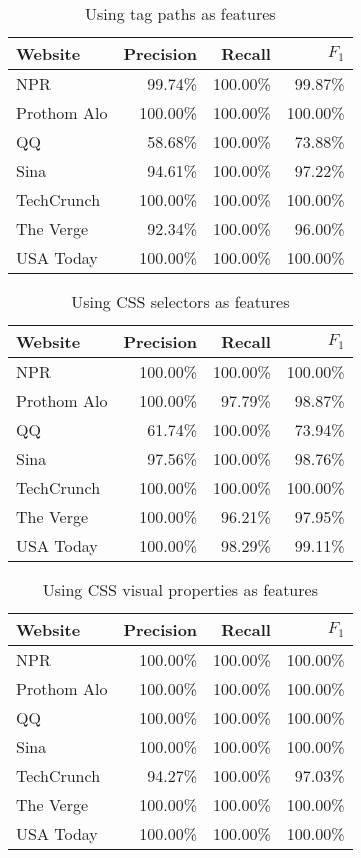 \documentclass{acm_proc_article-sp}
\begin{document}
\begin{table}
\centering
\caption{\label{table:tagpath}Using tag paths as features}
\begin{tabular}{|l|r|r|r|} \hline
Website&Precision&Recall&$F_1$\\ \hline\hline
NPR&99.74\%&100.00\%&99.87\%\\ \hline
Prothom Alo&100.00\%&100.00\%&100.00\%\\ \hline
QQ&58.68\%&100.00\%&73.88\%\\ \hline
Sina&94.61\%&100.00\%&97.22\%\\ \hline
TechCrunch&100.00\%&100.00\%&100.00\%\\ \hline
The Verge&92.34\%&100.00\%&96.00\%\\ \hline
USA Today&100.00\%&100.00\%&100.00\%\\ \hline
\end{tabular}
\end{table}

\begin{table}[t]
\centering
\caption{\label{table:selectors}Using CSS selectors as features}
\begin{tabular}{|l|r|r|r|} \hline
Website&Precision&Recall&$F_1$\\ \hline\hline
NPR&100.00\%&100.00\%&100.00\%\\ \hline
Prothom Alo&100.00\%&97.79\%&98.87\%\\ \hline
QQ&61.74\%&100.00\%&73.94\%\\ \hline
Sina&97.56\%&100.00\%&98.76\%\\ \hline
TechCrunch&100.00\%&100.00\%&100.00\%\\ \hline
The Verge&100.00\%&96.21\%&97.95\%\\ \hline
USA Today&100.00\%&98.29\%&99.11\%\\ \hline
\end{tabular}
\end{table}

\begin{table}[t]
\centering
\caption{\label{table:css}Using CSS visual properties as features}
\begin{tabular}{|l|r|r|r|} \hline
Website&Precision&Recall&$F_1$\\ \hline\hline
NPR&100.00\%&100.00\%&100.00\%\\ \hline
Prothom Alo&100.00\%&100.00\%&100.00\%\\ \hline
QQ&100.00\%&100.00\%&100.00\%\\ \hline
Sina&100.00\%&100.00\%&100.00\%\\ \hline
TechCrunch&94.27\%&100.00\%&97.03\%\\ \hline
The Verge&100.00\%&100.00\%&100.00\%\\ \hline
USA Today&100.00\%&100.00\%&100.00\%\\ \hline
\end{tabular}
\end{table}
\end{document}
